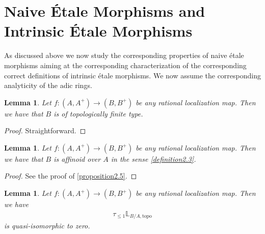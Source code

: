 \documentclass[12pt]{amsart}
\newtheorem{lemma}[theorem]{Lemma}
\theoremstyle{definition}
\numberwithin{equation}{section}
\begin{document}
\section{Naive \'Etale Morphisms and Intrinsic \'Etale Morphisms}




\indent As discussed above we now study the corresponding properties of naive \'etale morphisms aiming at the corresponding characterization of the corresponding correct definitions of intrinsic \'etale morphisms. We now assume the corresponding analyticity of the adic rings. 

\begin{lemma}
Let $f:(A,A^+)\rightarrow (B,B^+)$ be any rational localization map. Then we have that $B$ is of topologically finite type.
\end{lemma}

\begin{proof}
Straightforward.	
\end{proof}



\begin{lemma}
Let $f:(A,A^+)\rightarrow (B,B^+)$ be any rational localization map. Then we have that $B$ is affinoid over $A$ in the sense \cref{definition2.3}.
\end{lemma}

\begin{proof}
See the proof of \cref{proposition2.5}.	
\end{proof}



\begin{lemma}
Let $f:(A,A^+)\rightarrow (B,B^+)$ be any rational localization map. Then we have
\begin{align}
\tau_{\leq 1}\mathbb{L}_{B/A,\mathrm{topo}}	
\end{align}
is quasi-isomorphic to zero.
\end{lemma}
\end{document}

